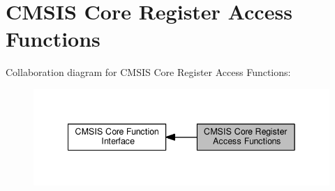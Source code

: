 \hypertarget{group___c_m_s_i_s___core___reg_acc_functions}{}\section{C\+M\+S\+IS Core Register Access Functions}
\label{group___c_m_s_i_s___core___reg_acc_functions}
Collaboration diagram for C\+M\+S\+IS Core Register Access Functions\+:\nopagebreak
\begin{figure}[H]
\begin{center}
\leavevmode
\includegraphics[width=342pt]{group___c_m_s_i_s___core___reg_acc_functions}
\end{center}
\end{figure}
